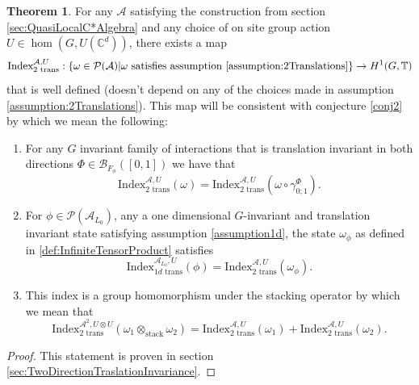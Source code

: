 \documentclass[12pt,a4paper,twoside]{article}
\newcommand{\BB}{\mathcal B}
\newcommand{\PP}{\mathcal P}
\newcommand{\CC}{\mathbb C}
\newcommand{\TT}{\mathbb T}
\renewcommand{\AA}{\mathcal A}
\theoremstyle{definition}
\newtheorem{theorem}{Theorem}[section]
\numberwithin{equation}{section}
\begin{document}
\begin{theorem}\label{thrm:ExistenceSecondIndex}
	For any $\AA$ satisfying the construction from section \ref{sec:QuasiLocalC*Algebra} and any choice of on site group action $U\in\hom(G,U(\CC^d))$, there exists a map
	\begin{equation}
		\textrm{Index}^{\AA,U}_{2\text{ trans}}:\{\omega\in\PP(\AA)| \omega\text{ satisfies assumption \ref{assumption:2Translations}}\}\rightarrow H^1(G,\TT)
	\end{equation}
	that is well defined (doesn't depend on any of the choices made in assumption \ref{assumption:2Translations}). This map will be consistent with conjecture \ref{conj2} by which we mean the following:
	\begin{enumerate}
		\item For any $G$ invariant family of interactions that is translation invariant in both directions $\Phi\in\BB_{F_\phi}([0,1])$ we have that
		\begin{equation}
			\textrm{Index}^{\AA,U}_{2\text{ trans}}(\omega)=\textrm{Index}^{\AA,U}_{2\text{ trans}}(\omega\circ\gamma^\Phi_{0;1}).
		\end{equation}
		\item For $\phi\in\PP(\AA_{L_0})$, any a one dimensional $G$-invariant and translation invariant state satisfying assumption \ref{assumption1d}, the state $\omega_\phi$ as defined in \ref{def:InfiniteTensorProduct} satisfies
		\begin{equation}
			\textrm{Index}^{\AA_{L_0},U}_{1d\text{ trans}}(\phi)=\text{Index}^{\AA,U}_{2\text{ trans}}(\omega_\phi).
		\end{equation}
		\item This index is a group homomorphism under the stacking operator by which we mean that
		\begin{equation}
			\textrm{Index}_{\text{2 trans}}^{\AA^2,U\otimes U}(\omega_1\otimes_{\text{stack}}\omega_2)=\textrm{Index}_{\text{2 trans}}^{\AA,U}(\omega_1)+\textrm{Index}_{\text{2 trans}}^{\AA,U}(\omega_2).
		\end{equation}
	\end{enumerate}
\end{theorem}
\begin{proof}
	This statement is proven in section \ref{sec:TwoDirectionTraslationInvariance}.
\end{proof}
\end{document}
